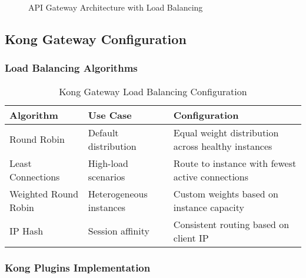 \begin{table}[H]
\begin{figure}[H]
\caption{API Gateway Architecture with Load Balancing}
\label{fig:api_gateway_architecture}
\end{figure}

\subsection{Kong Gateway Configuration}

\subsubsection{Load Balancing Algorithms}

\begin{table}[H]
\centering
\caption{Kong Gateway Load Balancing Configuration}
\begin{tabular}{|p{3cm}|p{4cm}|p{5cm}|}
\hline
\textbf{Algorithm} & \textbf{Use Case} & \textbf{Configuration} \\
\hline
Round Robin & Default distribution & Equal weight distribution across healthy instances \\
\hline
Least Connections & High-load scenarios & Route to instance with fewest active connections \\
\hline
Weighted Round Robin & Heterogeneous instances & Custom weights based on instance capacity \\
\hline
IP Hash & Session affinity & Consistent routing based on client IP \\
\hline
\end{tabular}
\end{table}

\subsubsection{Kong Plugins Implementation}


\end{table}
